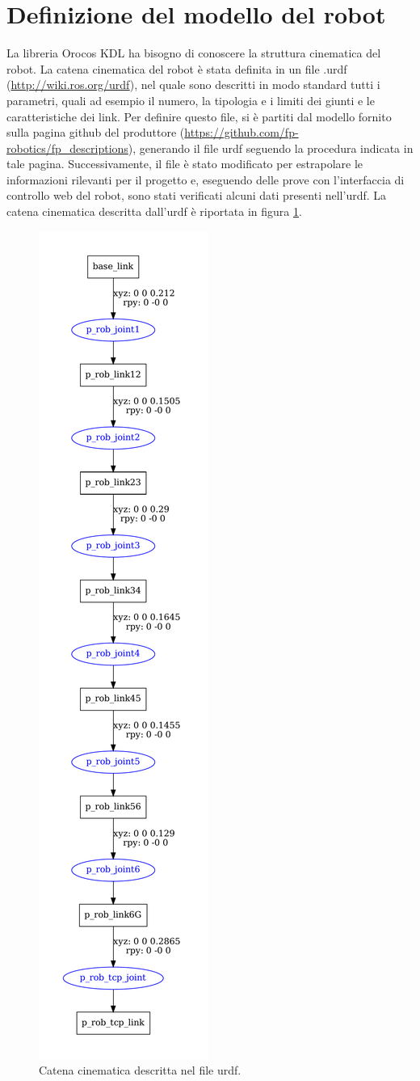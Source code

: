 \section{Definizione del modello del robot}
La libreria Orocos KDL ha bisogno di conoscere la struttura cinematica del robot. La catena cinematica del robot è stata definita in un file .urdf (\url{http://wiki.ros.org/urdf}), nel quale sono descritti in modo standard tutti i parametri, quali ad esempio il numero, la tipologia e i limiti dei giunti e le caratteristiche dei link. Per definire questo file, si è partiti dal modello fornito sulla pagina github del produttore (\url{https://github.com/fp-robotics/fp_descriptions}), generando il file urdf seguendo la procedura indicata in tale pagina. Successivamente, il file è stato modificato per estrapolare le informazioni rilevanti per il progetto e, eseguendo delle prove con l'interfaccia di controllo web del robot, sono stati verificati alcuni dati presenti nell'urdf. La catena cinematica descritta dall'urdf è riportata in figura \ref{fig:urdf_prob3}.
\begin{figure}[tbh]
	\centering
	\includegraphics[width=0.3\linewidth]{./OtherFiles/p_rob.pdf}
	\caption{Catena cinematica descritta nel file urdf.}
	\label{fig:urdf_prob3}
\end{figure}
